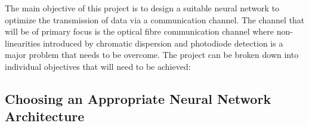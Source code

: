 
\iffalse
Your objectives are the most important part of the proposal. 

Tell the reader what you intend to accomplish; 
	see if you can state the expected outcomes in a clear fashion so that you know, 
	and the reader knows, what you are going to have when finished.
	
What theory will you work out? 
Or what measurements will you make? 
Or what circuit will you build? 
The clearer you are with this, the higher the chances will be for knowing how to get there.
Break the Objectives down into pieces on which each of your teammates will focus. 
Show how the individual objectives create the project’s overall end objective.

Once you know what you will be doing, put the steps into a Gantt Chart.Look online for a Gantt Chart description if you need to.

\fi

The main objective of this project is to design a suitable neural network to optimize the transmission of data via a communication channel. The channel that will be of primary focus is the optical fibre communication channel where non-linearities introduced by chromatic dispersion and photodiode detection is a major problem that needs to be overcome. The project can be broken down into individual objectives that will need to be achieved: 

\subsection{Choosing an Appropriate Neural Network Architecture}

